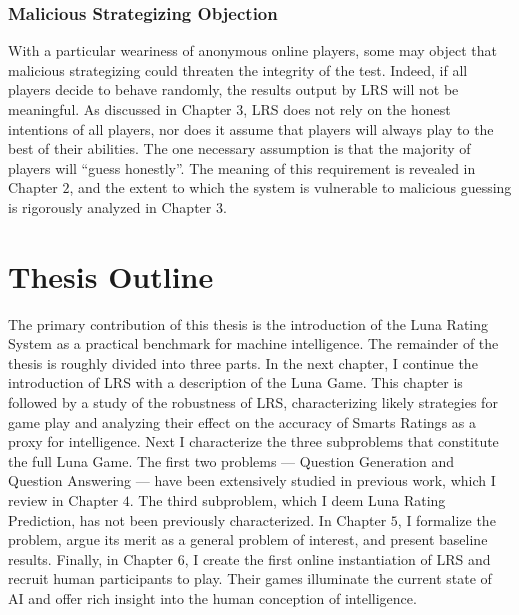 \subsubsection{Malicious Strategizing Objection}

With a particular weariness of anonymous online players, some may object that malicious strategizing could threaten the integrity of the test. Indeed, if all players decide to behave randomly, the results output by LRS will not be meaningful. As discussed in Chapter $3$, LRS does not rely on the honest intentions of all players, nor does it assume that players will always play to the best of their abilities. The one necessary assumption is that the majority of players will ``guess honestly''. The meaning of this requirement is revealed in Chapter $2$, and the extent to which the system is vulnerable to malicious guessing is rigorously analyzed in Chapter $3$.

\section{Thesis Outline}
The primary contribution of this thesis is the introduction of the Luna Rating System as a practical benchmark for machine intelligence. The remainder of the thesis is roughly divided into three parts. In the next chapter, I continue the introduction of LRS with a description of the Luna Game. This chapter is followed by a study of the robustness of LRS, characterizing likely strategies for game play and analyzing their effect on the accuracy of Smarts Ratings as a proxy for intelligence. Next I characterize the three subproblems that constitute the full Luna Game. The first two problems --- Question Generation and Question Answering --- have been extensively studied in previous work, which I review in Chapter $4$. The third subproblem, which I deem Luna Rating Prediction, has not been previously characterized. In Chapter $5$, I formalize the problem, argue its merit as a general problem of interest, and present baseline results. Finally, in Chapter $6$, I create the first online instantiation of LRS and recruit human participants to play. Their games illuminate the current state of AI and offer rich insight into the human conception of intelligence.
